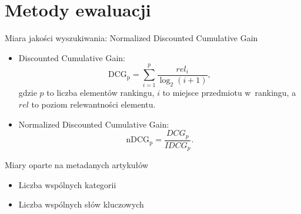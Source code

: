 \documentclass{beamer}
\begin{document}
	\section{Metody ewaluacji}
	
	
	\begin{frame}{Miara jakości wyszukiwania: Normalized Discounted Cumulative Gain}
		\begin{itemize}
			\item Discounted Cumulative Gain:
			\begin{equation}
			\label{eq:dcg}
			{\mathrm  {DCG_{{p}}}}=\sum _{{i=1}}^{{p}}{\frac  {rel_{i}}{\log _{{2}}(i+1)}},
			\end{equation}
			gdzie $p$ to liczba elementów rankingu, $i$ to miejsce przedmiotu w~rankingu, a $rel$ to poziom relewantności elementu.
			

			\item Normalized Discounted Cumulative Gain:
			\begin{equation}
			\label{eq:ndcg}
			{\mathrm  {nDCG_{{p}}}}={\frac  {DCG_{{p}}}{IDCG_{{p}}}}.
			\end{equation}
		\end{itemize}
	\end{frame}
	\begin{frame}{Miary oparte na metadanych artykułów}
		\begin{itemize}
			\item Liczba wspólnych kategorii
					
			\item Liczba wspólnych słów kluczowych
		\end{itemize}
	\end{frame}
\end{document}
